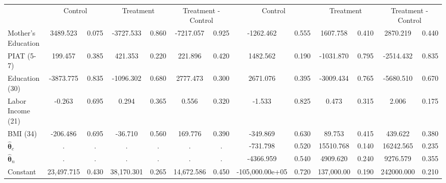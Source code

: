 \begin{tabular}{lcccccccccccc} \toprule
&\multicolumn{2}{c}{Control} & \multicolumn{2}{c}{Treatment} & \multicolumn{2}{c}{Treatment - Control} & \multicolumn{2}{c}{Control} & \multicolumn{2}{c}{Treatment} & \multicolumn{2}{c}{Treatment - Control} \\
Mother's Education &  3489.523 &     0.075 & -3727.533 &     0.860 & -7217.057 &     0.925 & -1262.462 &     0.555 &  1607.758 &     0.410 &  2870.219 &     0.440 \\  
PIAT (5-7) &   199.457 &     0.385 &   421.353 &     0.220 &   221.896 &     0.420 &  1482.562 &     0.190 & -1031.870 &     0.795 & -2514.432 &     0.835 \\  
Education (30) & -3873.775 &     0.835 & -1096.302 &     0.680 &  2777.473 &     0.300 &  2671.076 &     0.395 & -3009.434 &     0.765 & -5680.510 &     0.670 \\  
Labor Income (21) &    -0.263 &     0.695 &     0.294 &     0.365 &     0.556 &     0.320 &    -1.533 &     0.825 &     0.473 &     0.315 &     2.006 &     0.175 \\  
BMI (34) &  -206.486 &     0.695 &   -36.710 &     0.560 &   169.776 &     0.390 &  -349.869 &     0.630 &    89.753 &     0.415 &   439.622 &     0.380 \\  
$\hat{\bm{\theta}}_c$ &         . &         . &         . &         . &         . &         . &  -731.798 &     0.520 & 15510.768 &     0.140 & 16242.565 &     0.235 \\  
$\hat{\bm{\theta}}_n$ &         . &         . &         . &         . &         . &         . & -4366.959 &     0.540 &  4909.620 &     0.240 &  9276.579 &     0.355 \\  
Constant & 23,497.715 &     0.430 & 38,170.301 &     0.265 & 14,672.586 &     0.450 & -105,000.00e+05 &     0.720 &  137,000.00 &     0.190 &  242000.000 &     0.210 \\  
\bottomrule \end{tabular}
